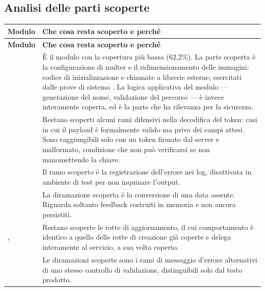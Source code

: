 \subsection{Analisi delle parti scoperte}

\begin{longtable}{@{}L{4.9cm} L{9.5cm}@{}}
\toprule
\textbf{Modulo} & \textbf{Che cosa resta scoperto e perché} \\
\midrule
\endfirsthead
\toprule
\textbf{Modulo} & \textbf{Che cosa resta scoperto e perché} \\
\midrule
\endhead
\bottomrule
\endlastfoot

 &
È il modulo con la copertura più bassa (62,2\%). La parte scoperta è la
configurazione di multer e il ridimensionamento delle immagini: codice di
inizializzazione e chiamate a librerie esterne, esercitati dalle prove di
sistema . La logica applicativa del modulo — generazione del
nome, validazione del percorso — è invece interamente coperta, ed è la parte
che ha rilevanza per la sicurezza. \\

 &
Restano scoperti alcuni rami difensivi nella decodifica del token: casi in
cui il payload è formalmente valido ma privo dei campi attesi. Sono
raggiungibili solo con un token firmato dal server e malformato, condizione
che non può verificarsi se non manomettendo la chiave. \\

 &
Il ramo scoperto è la registrazione dell'errore nei log, disattivata in
ambiente di test per non inquinare l'output. \\

 &
La diramazione scoperta è la conversione di una data assente. Riguarda
soltanto feedback costruiti in memoria e non ancora persistiti. \\

,  &
Restano scoperte le rotte di aggiornamento, il cui comportamento è identico a
quello delle rotte di creazione già coperte e delega interamente al servizio,
a sua volta coperto. \\

 &
Le diramazioni scoperte sono i rami di messaggio d'errore alternativi di uno
stesso controllo di validazione, distinguibili solo dal testo prodotto. \\

\end{longtable}
